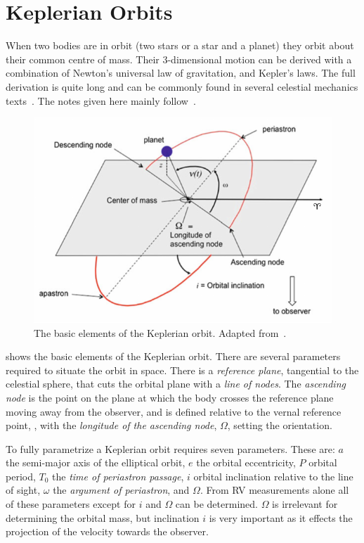 

\section{Keplerian Orbits}

When two bodies are in orbit (two stars or a star and a planet) they orbit about their common centre of mass.
Their 3-dimensional motion can be derived with a combination of Newton's universal law of gravitation, and Kepler's laws.
The full derivation is quite long and can be commonly found in several celestial mechanics texts~\citep[e.g.][]{moulton_introduction_1914, perryman_exoplanet_2011, fitzpatrick_introduction_2012}.
The notes given here mainly follow~\citep{bozza_methods_2016}.

\begin{figure}
    \centering
    \includegraphics[width=0.6\linewidth]{figures/fundamental_rv/orbit_diagram2.pdf}
    \caption{The basic elements of the Keplerian orbit. Adapted from~\citep{bozza_methods_2016}.}
    \label{fig:orbitdiagram}
\end{figure}

 shows the basic elements of the Keplerian orbit.
There are several parameters required to situate the orbit in space.
There is a \textit{reference plane}, tangential to the celestial sphere, that cuts the orbital plane with a \textit{line of nodes}.
The \textit{ascending node} is the point on the plane at which the body crosses the reference plane moving away from the observer, and is defined relative to the vernal reference point, \Aries, with the \textit{longitude of the ascending node}, $\Omega$, setting the orientation.

To fully parametrize a Keplerian orbit requires seven parameters.
These are: $a$ the semi-major axis of the elliptical orbit, $e$ the orbital eccentricity, $P$ orbital period, $T_0$ the \emph{time of periastron passage}, $i$ orbital inclination relative to the line of sight, $\omega$ the \emph{argument of periastron}, and $\Omega$.
From RV measurements alone all of these parameters except for $i$ and $\Omega$ can be determined.
$\Omega$ is irrelevant for determining the orbital mass, but inclination $i$ is very important as it effects the projection of the velocity towards the observer.


